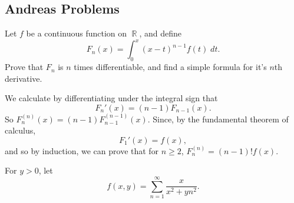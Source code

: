 \documentclass[answers]{exam}
\DeclareMathOperator{\RR}{\mathbb{R}}
\begin{document}
\begin{questions}

\newpage
\section{Andreas Problems}

\question Let $f$ be a continuous function on $\RR$, and define
%
\[ F_n(x) = \int_0^x (x - t)^{n-1} f(t)\; dt. \]
%
Prove that $F_n$ is $n$ times differentiable, and find a simple formula for it's $n$th derivative.
\begin{solution}
	We calculate by differentiating under the integral sign that
	\[ F_n'(x) = (n-1) F_{n-1}(x). \]
	So $F_n^{(n)}(x) = (n-1) F_{n-1}^{(n-1)}(x)$. Since, by the fundamental theorem of calculus,
	\[ F_1'(x) = f(x), \]
	and so by induction, we can prove that for $n \geq 2$, $F_n^{(n)} = (n-1)! f(x)$.
\end{solution}

\question For $y > 0$, let
%
\[ f(x,y) = \sum_{n = 1}^\infty \frac{x}{x^2 + yn^2}. \]
%
\begin{parts}

\end{parts}
\end{questions}
\end{document}
